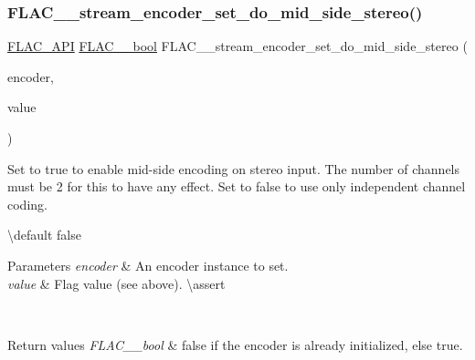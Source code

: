 \subsubsection{\texorpdfstring{FLAC\_\_stream\_encoder\_set\_do\_mid\_side\_stereo()}{FLAC\_\_stream\_encoder\_set\_do\_mid\_side\_stereo()}}
{\footnotesize\ttfamily \mbox{\hyperlink{group__flac__export_ga56ca07df8a23310707732b1c0007d6f5}{F\+L\+A\+C\+\_\+\+A\+PI}} \mbox{\hyperlink{ordinals_8h_a95103469f1cbd78b8cf250194985b34e}{F\+L\+A\+C\+\_\+\+\_\+bool}} F\+L\+A\+C\+\_\+\+\_\+stream\+\_\+encoder\+\_\+set\+\_\+do\+\_\+mid\+\_\+side\+\_\+stereo (\begin{DoxyParamCaption}\item[{\mbox{\hyperlink{struct_f_l_a_c_____stream_encoder}{F\+L\+A\+C\+\_\+\+\_\+\+Stream\+Encoder}} $\ast$}]{encoder,  }\item[{\mbox{\hyperlink{ordinals_8h_a95103469f1cbd78b8cf250194985b34e}{F\+L\+A\+C\+\_\+\+\_\+bool}}}]{value }\end{DoxyParamCaption})}

Set to {\ttfamily true} to enable mid-\/side encoding on stereo input. The number of channels must be 2 for this to have any effect. Set to {\ttfamily false} to use only independent channel coding.

\textbackslash{}default {\ttfamily false} 
\begin{DoxyParams}{Parameters}
{\em encoder} & An encoder instance to set. \\
\hline
{\em value} & Flag value (see above). \textbackslash{}assert 
\begin{DoxyCode}{1}
\end{DoxyCode}
 \\
\hline
\end{DoxyParams}

\begin{DoxyRetVals}{Return values}
{\em F\+L\+A\+C\+\_\+\+\_\+bool} & {\ttfamily false} if the encoder is already initialized, else {\ttfamily true}. \\
\hline
\end{DoxyRetVals}
\mbox{\label{group__flac__stream__encoder_ga3aa94a1aec1cf40c37e54434c86bb50d}} 
